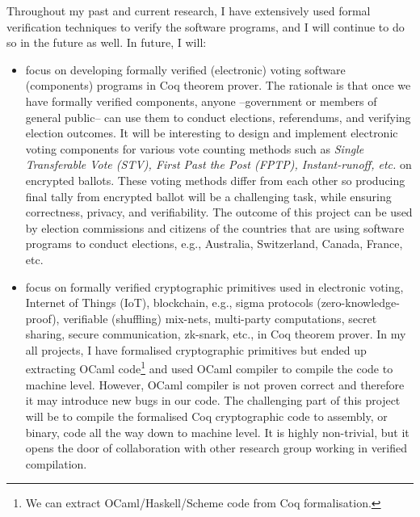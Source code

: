 \documentclass[a4paper]{article}
\begin{document}
Throughout my past and current research, I have extensively used formal verification techniques 
to verify the software programs, and I will continue to do so in the future as well. 
In future, I will:

\begin{itemize}

\item focus on developing formally verified (electronic) voting 
software (components) programs in Coq theorem prover. 
The rationale is that once we have formally verified 
components, anyone --government or members of general public-- can use them 
to conduct elections, referendums, and verifying election outcomes.
It will be interesting to design and implement electronic voting components  
for various vote counting methods such as \textit{Single Transferable Vote (STV), 
First Past the Post (FPTP), Instant-runoff, etc.} on encrypted ballots. These 
voting methods differ from each other so producing final tally from encrypted 
ballot will be a challenging task, while ensuring correctness, privacy, and verifiability. 
The outcome of this project can be used by election commissions and citizens of 
the countries that are using software programs to conduct elections, e.g.,
Australia, Switzerland, Canada, France, etc. 


\item focus on formally verified cryptographic primitives used in electronic voting, 
  Internet of Things (IoT), blockchain, e.g., 
	sigma protocols (zero-knowledge-proof), verifiable (shuffling) mix-nets, 
	multi-party computations, secret sharing, secure communication, zk-snark, etc., 
	in Coq theorem prover. In my all projects, I have formalised
	cryptographic primitives but ended up extracting OCaml 
	code\footnote{We can extract OCaml/Haskell/Scheme 
	code from Coq formalisation.} and used OCaml compiler to 
	compile the code to machine level. However, OCaml compiler is not proven correct 
	and therefore it may introduce new bugs in our code. The challenging part 
	of this project will be to compile the formalised Coq cryptographic 
	code to assembly, or binary, code 
	all the way down to machine level. It is highly non-trivial, but it opens the door of 
	collaboration with other research group working in verified compilation.


\end{itemize}
\end{document}

